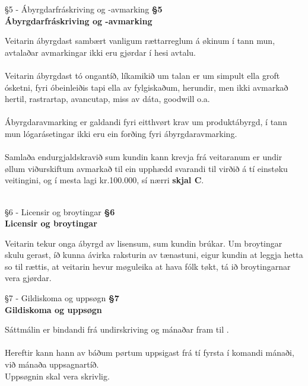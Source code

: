 \begin{center}
	 {§5 - Ábyrgdarfráskriving og -avmarking}
	\textbf{§5 \\ Ábyrgdarfráskriving og -avmarking}
\end{center}
Veitarin ábyrgdast sambært vanligum rættarreglum á økinum í tann mun, avtalaðar avmarkingar ikki eru gjørdar í hesi avtalu. \\ \\
Veitarin ábyrgdast tó ongantíð, líkamikið um talan er um simpult ella groft ósketni, fyri óbeinleiðis tapi ella av fylgiskaðum, herundir, men ikki avmarkað hertil, rastrartap, avancutap, miss av dáta, goodwill o.a. \\ \\
Ábyrgdaravmarking er galdandi fyri eitthvørt krav um produktábyrgd, í tann mun lógarásetingar ikki eru ein forðing fyri ábyrgdaravmarking. \\ \\
Samlaða endurgjaldskravið sum kundin kann krevja frá veitaranum er undir øllum viðurskiftum avmarkað til ein upphædd svarandi til virðið á tí einstøku veitingini, og í mesta lagi kr.100.000, sí nærri \textbf{skjal C}. \\ \\

\begin{center}
	 {§6 - Licensir og broytingar}
	\textbf{§6 \\ Licensir og broytingar}
\end{center}
Veitarin tekur onga ábyrgd av lisensum, sum kundin brúkar. Um broytingar skulu gerast, íð kunna ávirka raksturin av tænastuni, eigur kundin at leggja hetta so til rættis, at veitarin hevur møguleika at hava fólk tøkt, tá ið broytingarnar vera gjørdar.

\begin{center}
	 {§7 - Gildiskoma og uppsøgn}
	\textbf{§7 \\ Gildiskoma og uppsøgn}
\end{center}
Sáttmálin er bindandi frá undirskriving og \bindingsperiodeA mánaðar fram til \datoBindingA. \\ \\
Hereftir kann hann av báðum pørtum uppsigast frá tí fyrsta í komandi mánaði, við \bindingsperiodeB mánaða uppsagnartíð. \\ 
Uppsøgnin skal vera skrivlig.

